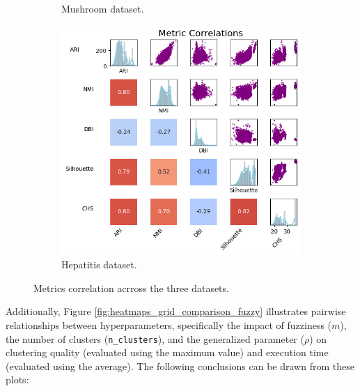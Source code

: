 \begin{figure}[H]
\begin{subfigure}{0.32\textwidth}
		\caption{Mushroom dataset.}
	\end{subfigure}
	\begin{subfigure}{0.32\textwidth}
		\centering
		\includegraphics[width=\linewidth]{figures/FuzzyCMeans/hepatitis_metrics_correlations_matrix.png}
		\caption{Hepatitis dataset.}
	\end{subfigure}
	\caption{Metrics correlation acrross the three datasets.}
	\label{fig:metrics_corr_fuzzy}
\end{figure}

Additionally, Figure \ref{fig:heatmaps_grid_comparison_fuzzy} illustrates pairwise relationships between hyperparameters, specifically the impact of fuzziness ($m$), the number of clusters (\texttt{n\_clusters}), and the generalized parameter ($\rho$) on clustering quality (evaluated using the maximum value) and execution time (evaluated using the average). The following conclusions can be drawn from these plots:

